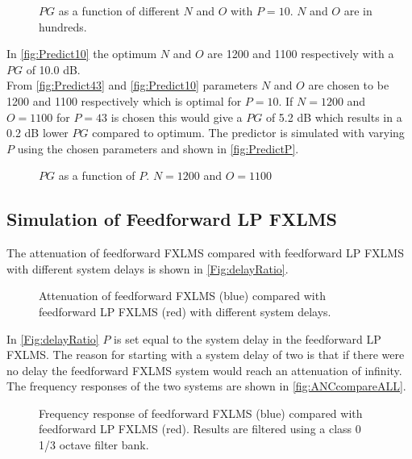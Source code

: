 \begin{figure}[H]
	\centering
	
	\caption{$PG$ as a function of different $N$ and $O$ with $P=10$. $N$ and $O$ are in hundreds.}
	\label{fig:Predict10}
\end{figure}
In \autoref{fig:Predict10} the optimum $N$ and $O$ are 1200 and 1100 respectively with a $PG$ of 10.0 dB.\\

From \autoref{fig:Predict43} and \autoref{fig:Predict10} parameters $N$ and $O$ are chosen to be 1200 and 1100 respectively which is optimal for $P=10$. If $N=1200$ and $O=1100$ for $P=43$ is chosen this would give a $PG$ of 5.2 dB which results in a 0.2 dB lower $PG$ compared to optimum.
The predictor is simulated with varying $P$ using the chosen parameters and shown in \autoref{fig:PredictP}.

\begin{figure}[H]
	\centering
	
	\caption{$PG$ as a function of $P$. $N=1200$ and $O=1100$}
	\label{fig:PredictP}
\end{figure}



\subsection{Simulation of Feedforward LP FXLMS}
The attenuation of feedforward FXLMS compared with feedforward LP FXLMS with different system delays is shown in \autoref{Fig:delayRatio}.
\begin{figure}[H]
	\centering
	
	\caption{Attenuation of feedforward FXLMS (blue) compared with feedforward LP FXLMS (red) with different system delays.}
	\label{Fig:delayRatio}
\end{figure}
In \autoref{Fig:delayRatio} $P$ is set equal to the system delay in the feedforward LP FXLMS. The reason for starting with a system delay of two is that if there were no delay the feedforward FXLMS system would reach an attenuation of infinity. The frequency responses of the two systems are shown in \autoref{fig:ANCcompareALL}.  

\begin{figure}[H]
	\centering
	
	\caption{Frequency response of feedforward FXLMS (blue) compared with feedforward LP FXLMS (red). Results are filtered using a class 0 1/3 octave filter bank\cite{OctaveBand}.}
	\label{fig:ANCcompareALL}
\end{figure}        
        




